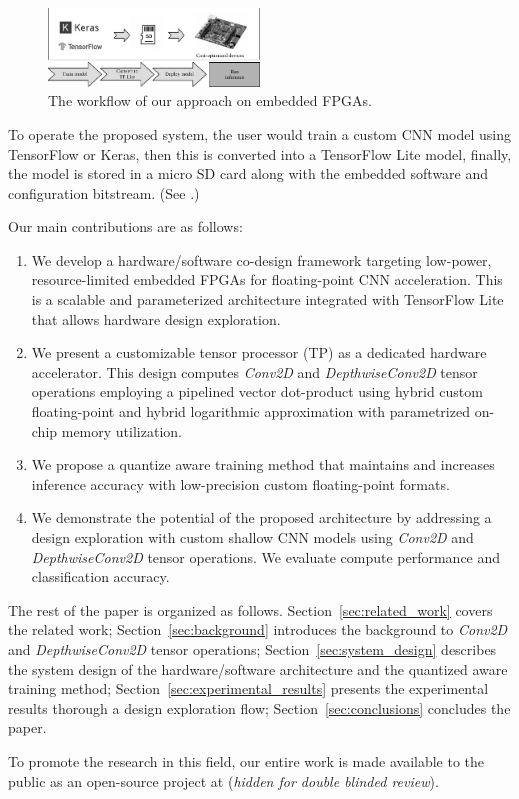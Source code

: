\begin{figure}[t!]
	\centering
	\includegraphics[width=0.5\textwidth]{../figures/workflow.pdf}
	\caption{The workflow of our approach on embedded FPGAs.}
	\label{fig:workflow}
\end{figure}

To operate the proposed system, the user would train a custom CNN model using TensorFlow or Keras, then this is converted into a TensorFlow Lite model, finally, the model is stored in a micro SD card along with the embedded software and configuration bitstream. (See .)

Our main contributions are as follows:
\begin{enumerate}
	\item We develop a hardware/software co-design framework targeting low-power, resource-limited embedded FPGAs for floating-point CNN acceleration. This is a scalable and parameterized architecture integrated with TensorFlow Lite that allows hardware design exploration.
	\item We present a customizable tensor processor (TP) as a dedicated hardware accelerator. This design computes \emph{Conv2D} and \emph{DepthwiseConv2D} tensor operations employing a pipelined vector dot-product using hybrid custom floating-point and hybrid logarithmic approximation with parametrized on-chip memory utilization.
	\item We propose a quantize aware training method that maintains and increases inference accuracy with low-precision custom floating-point formats.
	\item We demonstrate the potential of the proposed architecture by addressing a design exploration with custom shallow CNN models using \emph{Conv2D} and \emph{DepthwiseConv2D} tensor operations. We evaluate compute performance and classification accuracy.
\end{enumerate}

The rest of the paper is organized as follows. Section~\ref{sec:related_work} covers the related work; Section~\ref{sec:background} introduces the background to \emph{Conv2D} and \emph{DepthwiseConv2D} tensor operations; Section~\ref{sec:system_design} describes the system design of the hardware/software architecture and the quantized aware training method; Section~\ref{sec:experimental_results} presents the experimental results thorough a design exploration flow; Section~\ref{sec:conclusions} concludes the paper.

To promote the research in this field, our entire work is made available to the public as an open-source project at (\emph{hidden for double blinded review}).